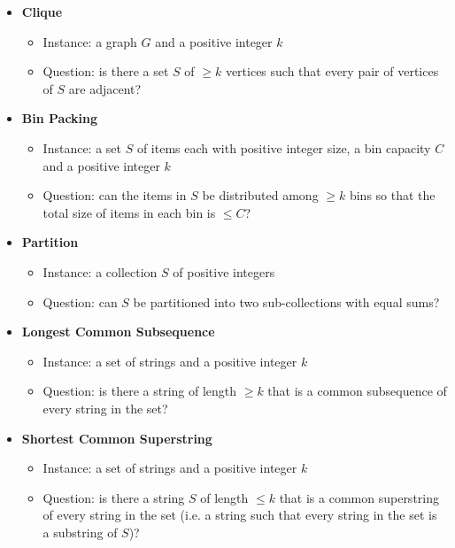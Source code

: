 \documentclass[a4paper, openany]{memoir}
\begin{document}
\begin{itemize}
        \item \textbf{Clique}
        \begin{itemize}
            \item Instance: a graph $G$ and a positive integer $k$
            \item Question: is there a set $S$ of $\geq k$ vertices such that every pair of vertices of $S$ are adjacent?
        \end{itemize}

        \item \textbf{Bin Packing}
        \begin{itemize}
            \item Instance: a set $S$ of items each with positive integer size, a bin capacity $C$ and a positive integer $k$ 
            \item Question: can the items in $S$ be distributed among $\geq k$ bins so that the total size of items in each bin is $\leq C$?
        \end{itemize}

        \item \textbf{Partition}
        \begin{itemize}
            \item Instance: a collection $S$ of positive integers
            \item Question: can $S$ be partitioned into two sub-collections with equal sums?
        \end{itemize}

        \item \textbf{Longest Common Subsequence}
        \begin{itemize}
            \item Instance: a set of strings and a positive integer $k$
            \item Question: is there a string of length $\geq k$ that is a common subsequence of every string in the set?
        \end{itemize}

        \item \textbf{Shortest Common Superstring}
        \begin{itemize}
            \item Instance: a set of strings and a positive integer $k$
            \item Question: is there a string $S$ of length $\leq k$ that is a common superstring of every string in the set (i.e. a string such that every string in the set is a substring of $S$)?
        \end{itemize}


\end{itemize}
\end{document}
